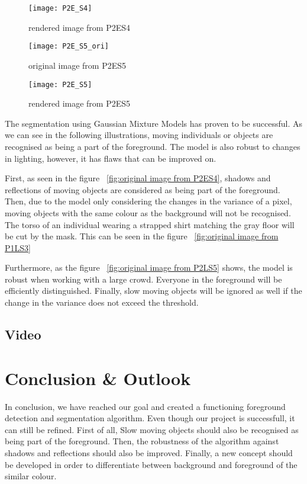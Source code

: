 \begin{figure}[h]
	\texttt{[image: P2E\_S4]}
	\caption{rendered image from P2ES4}
	\label{fig:rendered image from P2ES4}
\end{figure}

\begin{figure}[h]
	\texttt{[image: P2E\_S5\_ori]}
	\caption{original image from P2ES5}
	\label{fig:original image from P2ES5}
\end{figure}

\begin{figure}[h]
	\texttt{[image: P2E\_S5]}
	\caption{rendered image from P2ES5}
	\label{fig:rendered image from P2ES5}
\end{figure}

The segmentation using Gaussian Mixture Models has proven to be successful. As we can see in the following illustrations, moving individuals or objects are recognised as being a part of the foreground. The model is also robust to changes in lighting, however, it has flaws that can be improved on. 


First, as seen in the figure ~\ref{fig:original image from P2ES4}, shadows and reflections of moving objects are considered as being part of the foreground. \\

Then, due to the model only considering the changes in the variance of a pixel, moving objects with the same colour as the background will not be recognised. The torso of an individual wearing a strapped shirt matching the gray floor will be cut by the mask. This can be seen in the figure ~\ref{fig:original image from P1LS3}

Furthermore, as the figure ~\ref{fig:original image from P2LS5} shows, the model is robust when working with a large crowd. Everyone in the foreground will be efficiently distinguished.
Finally, slow moving objects will be ignored as well if the change in the variance does not exceed the threshold. 


\subsection{Video}

\section{Conclusion \& Outlook} 
In conclusion, we have reached our goal and created a functioning foreground detection and segmentation algorithm. Even though our project is successfull, it can still be refined. First of all, Slow moving objects should also be recognised as being part of the foreground. Then, the robustness of the algorithm against shadows and reflections should also be improved. Finally, a new concept should be developed in order to differentiate between background and foreground of the similar colour.  


